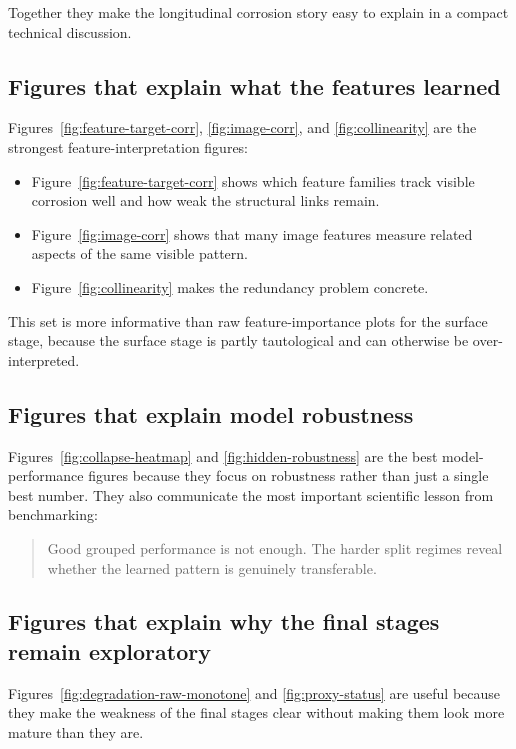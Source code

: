 \documentclass[10pt,a4paper,twocolumn]{article}
\begin{document}
Together they make the longitudinal corrosion story easy to explain in a compact technical discussion.

\subsection{Figures that explain what the features learned}

Figures~\ref{fig:feature-target-corr}, \ref{fig:image-corr}, and \ref{fig:collinearity} are the strongest feature-interpretation figures:

\begin{itemize}
    \item Figure~\ref{fig:feature-target-corr} shows which feature families track visible corrosion well and how weak the structural links remain.
    \item Figure~\ref{fig:image-corr} shows that many image features measure related aspects of the same visible pattern.
    \item Figure~\ref{fig:collinearity} makes the redundancy problem concrete.
\end{itemize}

This set is more informative than raw feature-importance plots for the surface stage, because the surface stage is partly tautological and can otherwise be over-interpreted.

\subsection{Figures that explain model robustness}

Figures~\ref{fig:collapse-heatmap} and \ref{fig:hidden-robustness} are the best model-performance figures because they focus on robustness rather than just a single best number. They also communicate the most important scientific lesson from benchmarking:

\begin{quote}
Good grouped performance is not enough. The harder split regimes reveal whether the learned pattern is genuinely transferable.
\end{quote}

\subsection{Figures that explain why the final stages remain exploratory}

Figures~\ref{fig:degradation-raw-monotone} and \ref{fig:proxy-status} are useful because they make the weakness of the final stages clear without making them look more mature than they are.
\end{document}
